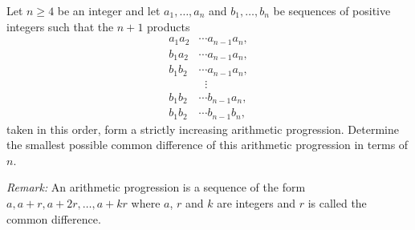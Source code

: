 Let $n \geq 4$ be an integer and let $a_1, \ldots, a_n$ and $b_1, \ldots, b_n$ be sequences
of positive integers such that the $n+1$ products
\begin{align*}
a_1a_2 & \cdots a_{n-1}a_n, \\
b_1a_2 & \cdots a_{n-1}a_n, \\
b_1b_2 & \cdots a_{n-1}a_n, \\
 & \; \; \vdots \\
b_1b_2 & \cdots b_{n-1}a_n, \\
b_1b_2 & \cdots b_{n-1}b_n,        
\end{align*}
taken in this order, form a strictly increasing arithmetic progression.
Determine the smallest possible common difference of this arithmetic progression in terms of $n$.

\emph{Remark:} An arithmetic progression is a sequence of the form $a, a+r, a+2r, \ldots, a+kr$
where $a$, $r$ and $k$ are integers and $r$ is called the common difference.

